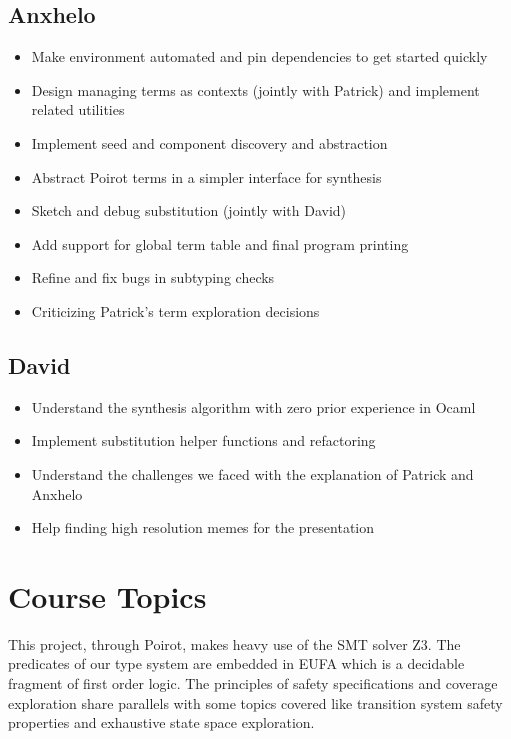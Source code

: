 \documentclass[review, sigplan]{acmart}
\begin{document}
\subsection{Anxhelo}
\begin{itemize}
  \item Make environment automated and pin dependencies to get started quickly
  \item Design managing terms as contexts (jointly with Patrick) and implement
        related utilities
  \item Implement seed and component discovery and abstraction
  \item Abstract Poirot terms in a simpler interface for synthesis
  \item Sketch and debug substitution (jointly with David)
  \item Add support for global term table and final program printing
  \item Refine and fix bugs in subtyping checks
  \item Criticizing Patrick's term exploration decisions
\end{itemize}

\subsection{David}
\begin{itemize}
  \item Understand the synthesis algorithm with zero prior experience in Ocaml
  \item Implement substitution helper functions and refactoring
  \item Understand the challenges we faced with the explanation of Patrick and Anxhelo
  \item Help finding high resolution memes for the presentation
\end{itemize}

\section{Course Topics}
This project, through Poirot, makes heavy use of the SMT solver Z3. The
predicates of our type system are embedded in EUFA which is a decidable fragment
of first order logic. The principles of safety specifications and coverage
exploration share parallels with some topics covered like transition system
safety properties and exhaustive state space exploration.
\end{document}
